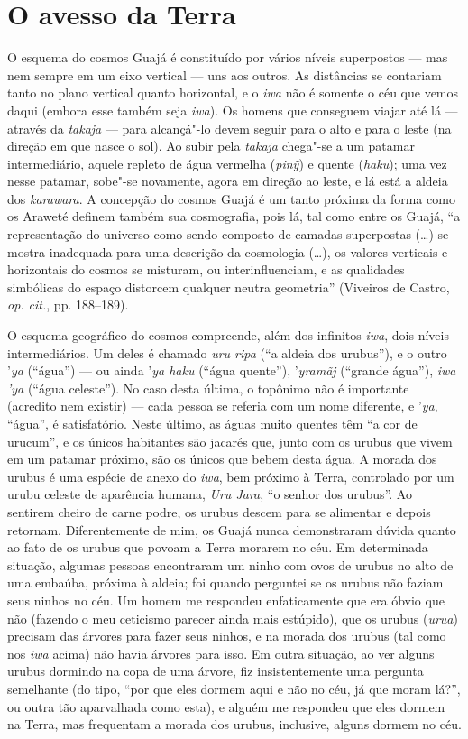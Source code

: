 \section{O avesso da Terra}

O esquema do cosmos Guajá é constituído por vários níveis superpostos ---
mas nem sempre em um eixo vertical --- uns aos outros. As distâncias se
contariam tanto no plano vertical quanto horizontal, e o \emph{iwa} não
é somente o céu que vemos daqui (embora esse também seja \emph{iwa}). Os
homens que conseguem viajar até lá --- através da \emph{takaja} --- para
alcançá"-lo devem seguir para o alto e para o leste (na direção em que
nasce o sol). Ao subir pela \emph{takaja} chega"-se a um patamar
intermediário, aquele repleto de água vermelha (\emph{pinỹ}) e quente
(\emph{haku}); uma vez nesse patamar, sobe"-se novamente, agora em
direção ao leste, e lá está a aldeia dos \emph{karawara}. A concepção do
cosmos Guajá é um tanto próxima da forma como os Araweté definem também
sua cosmografia, pois lá, tal como entre os Guajá, ``a representação do
universo como sendo composto de camadas superpostas (\ldots{}) se mostra
inadequada para uma descrição da cosmologia (\ldots{}), os valores verticais
e horizontais do cosmos se misturam, ou interinfluenciam, e as
qualidades simbólicas do espaço distorcem qualquer neutra geometria''
(Viveiros de Castro, \emph{op. cit.}, pp. 188--189).

O esquema geográfico do cosmos compreende, além dos infinitos
\emph{iwa}, dois níveis intermediários. Um deles é chamado \emph{uru
ripa} (``a aldeia dos urubus''), e o outro '\emph{ya} (``água'') --- ou ainda
'\emph{ya haku} (``água quente''), '\emph{yramãj} (``grande água''),
\emph{iwa 'ya} (``água celeste''). No caso desta última, o topônimo não é
importante (acredito nem existir) --- cada pessoa se referia com um nome
diferente, e '\emph{ya}, ``água'', é satisfatório. Neste último, as águas
muito quentes têm ``a cor de urucum'', e os únicos habitantes são jacarés
que, junto com os urubus que vivem em um patamar próximo, são os únicos
que bebem desta água. A morada dos urubus é uma espécie de anexo do
\emph{iwa}, bem próximo à Terra, controlado por um urubu celeste de
aparência humana, \emph{Uru Jara}, ``o senhor dos urubus''. Ao sentirem
cheiro de carne podre, os urubus descem para se alimentar e depois
retornam. Diferentemente de mim, os Guajá nunca demonstraram dúvida
quanto ao fato de os urubus que povoam a Terra morarem no céu. Em
determinada situação, algumas pessoas encontraram um ninho com ovos de
urubus no alto de uma embaúba, próxima à aldeia; foi quando perguntei se
os urubus não faziam seus ninhos no céu. Um homem me respondeu
enfaticamente que era óbvio que não (fazendo o meu ceticismo parecer
ainda mais estúpido), que os urubus (\emph{urua}) precisam das árvores
para fazer seus ninhos, e na morada dos urubus (tal como nos \emph{iwa}
acima) não havia árvores para isso. Em outra situação, ao ver alguns
urubus dormindo na copa de uma árvore, fiz insistentemente uma pergunta
semelhante (do tipo, ``por que eles dormem aqui e não no céu, já que
moram lá?'', ou outra tão aparvalhada como esta), e alguém me respondeu
que eles dormem na Terra, mas frequentam a morada dos urubus, inclusive,
alguns dormem no céu.

